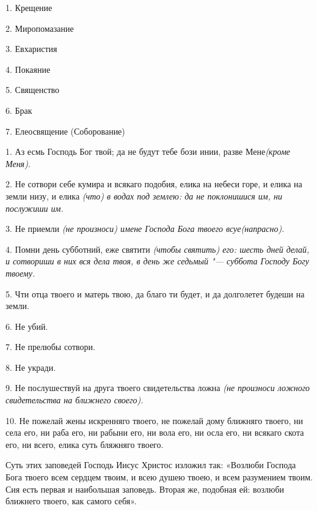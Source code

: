 


 

 


1. Крещение


2. Миропомазание


3. Евхаристия


4. Покаяние


5. Священство


6. Брак


7. Елеосвящение (Соборование)


\mychapterending

 


1. Аз есмь Господь Бог твой; да не будут тебе бози инии, разве Мене\itshape  (кроме Меня)\normalfont{}.

2. Не сотвори себе кумира и всякаго подобия, елика на небеси горе, и елика на земли низу, и елика \itshape (что)\normalfont{} в водах под землею: да не поклонишися им, ни послужиши им.

3. Не приемли \itshape (не произноси)\normalfont{} имене Господа Бога твоего всуе\itshape  (напрасно)\normalfont{}.

4. Помни день субботний, еже святити \itshape (чтобы святить) \normalfont{}его: шесть дней делай, и сотвориши в них вся дела твоя, в день же седьмый "--- суббота Господу Богу твоему.

5. Чти отца твоего и матерь твою, да благо ти будет, и да долголетет будеши на земли.

6. Не убий.

7. Не прелюбы сотвори.

8. Не укради.

9. Не послушествуй на друга твоего свидетельства ложна \itshape (не произноси ложного свидетельства на ближнего своего)\normalfont{}.

10. Не пожелай жены искренняго твоего, не пожелай дому ближняго твоего, ни села его, ни раба его, ни рабыни его, ни вола его, ни осла его, ни всякаго скота его, ни всего, елика суть бляжняго твоего.


Суть этих заповедей Господь Иисус Христос изложил так: «Возлюби Господа Бога твоего всем сердцем твоим, и всею душею твоею, и всем разумением твоим. Сия есть первая и наибольшая заповедь. Вторая же, подобная ей: возлюби ближнего твоего, как самого себя».

